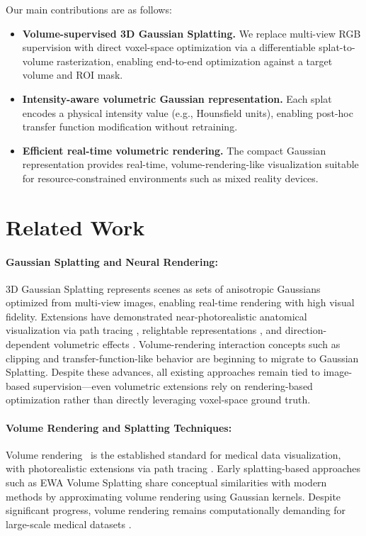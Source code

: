 \documentclass[runningheads]{llncs}
\begin{document}
Our main contributions are as follows:

\begin{itemize}
\item \textbf{Volume-supervised 3D Gaussian Splatting.} We replace multi-view RGB supervision with direct voxel-space optimization via a differentiable splat-to-volume rasterization, enabling end-to-end optimization against a target volume and ROI mask.
\item \textbf{Intensity-aware volumetric Gaussian representation.} Each splat encodes a physical intensity value (e.g., Hounsfield units), enabling post-hoc transfer function modification without retraining.
\item \textbf{Efficient real-time volumetric rendering.} The compact Gaussian representation provides real-time, volume-rendering-like visualization suitable for resource-constrained environments such as mixed reality devices.
\end{itemize}


\section{Related Work}

\paragraph{Gaussian Splatting and Neural Rendering:}
3D Gaussian Splatting \cite{kerbl2023gaussiansplatting} represents scenes as sets of anisotropic Gaussians optimized from multi-view images, enabling real-time rendering with high visual fidelity. Extensions have demonstrated near-photorealistic anatomical visualization via path tracing \cite{cinematicgaussians2024}, relightable representations \cite{relightablegaussian2024}, and direction-dependent volumetric effects \cite{ddgsct2024,sixdgs2024}. Volume-rendering interaction concepts such as clipping \cite{raraclipper2025} and transfer-function-like behavior \cite{ivrgs2025} are beginning to migrate to Gaussian Splatting. Despite these advances, all existing approaches remain tied to image-based supervision—even volumetric extensions rely on rendering-based optimization rather than directly leveraging voxel-space ground truth.

\paragraph{Volume Rendering and Splatting Techniques:}
Volume rendering~\cite{drebin1988volume} is the established standard for medical data visualization, with photorealistic extensions via path tracing \cite{kroes2012exposure}. Early splatting-based approaches such as EWA Volume Splatting \cite{ewasplatting2001} share conceptual similarities with modern methods by approximating volume rendering using Gaussian kernels. Despite significant progress, volume rendering remains computationally demanding for large-scale medical datasets \cite{cgf2025gs}.
\end{document}
